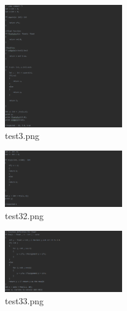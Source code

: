 \documentclass{article}
\begin{document}
\begin{multicols}{2}
					\begin{figure}[H]
					\centering
			 			\includegraphics[width=0.45\textwidth]{test3.png}
			 			\centering
			  			\caption{test3.png}
			  			\label{fig:test3}
					\end{figure}

					

					\begin{figure}[H]
					\centering
			 			\includegraphics[width=0.45\textwidth]{test32.png}
			 			\centering
			  			\caption{test32.png}
			  			\label{fig:test32}
					\end{figure}
					
										\begin{figure}[H]
					\centering
			 			\includegraphics[width=0.45\textwidth]{test33.png}
			 			\centering
			  			\caption{test33.png}
			  			\label{fig:test33}
					\end{figure}					
			\end{multicols}
			
		
			
		
		
		\nocite{*}

			
		
			
					
			
\end{document}

